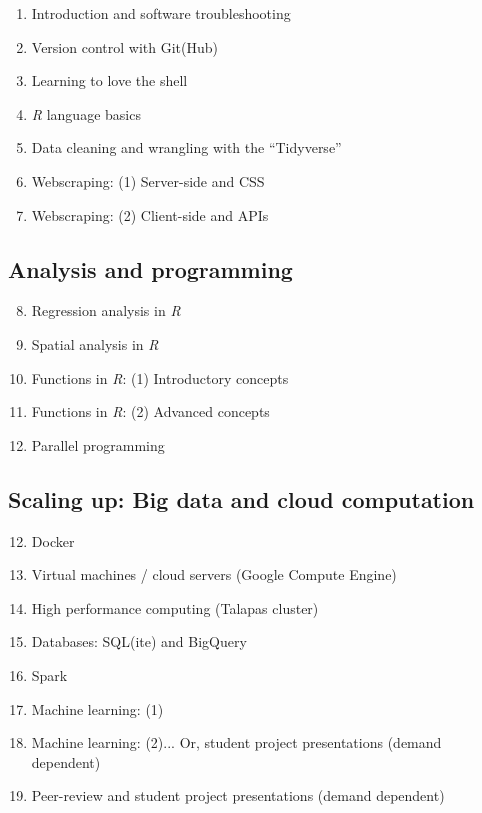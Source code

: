 \documentclass[12]{article}
\begin{document}
\begin{enumerate}
	\item Introduction and software troubleshooting
	\item Version control with Git(Hub)
	\item Learning to love the shell
	\item \textit{R} language basics
	\item Data cleaning and wrangling with the ``Tidyverse''
	\item Webscraping: (1) Server-side and CSS
	\item Webscraping: (2) Client-side and APIs
\end{enumerate}

\subsection*{Analysis and programming}

\begin{enumerate}
	\setcounter{enumi}{7}
	\item Regression analysis in \textit{R}
	\item Spatial analysis in \textit{R}
	\item Functions in \textit{R}: (1) Introductory concepts
	\item Functions in \textit{R}: (2) Advanced concepts
	\item Parallel programming
\end{enumerate}

\subsection*{Scaling up: Big data and cloud computation}

\begin{enumerate}
	\setcounter{enumi}{11}
	\item Docker
	\item Virtual machines / cloud servers (Google Compute Engine)
	\item High performance computing (Talapas cluster) 
	\item Databases: SQL(ite) and BigQuery
	\item Spark
	\item Machine learning: (1)
	\item Machine learning: (2)... Or, student project presentations (demand dependent)
	\item Peer-review and student project presentations (demand dependent)
\end{enumerate}
\end{document}
